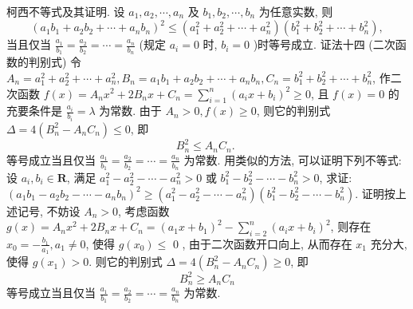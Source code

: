 柯西不等式及其证明.
设 $a_1, a_2, \cdots, a_n$ 及 $b_1, b_2, \cdots, b_n$ 为任意实数, 则
$$
\left(a_1 b_1+a_2 b_2+\cdots+a_n b_n\right)^2 \leqslant\left(a_1^2+a_2^2+\cdots+a_n^2\right)\left(b_1^2+b_2^2+\cdots+b_n^2\right),
$$
当且仅当 $\frac{a_1}{b_1}=\frac{a_2}{b_2}=\cdots=\frac{a_n}{b_n}$ (规定 $a_i=0$ 时, $b_i=0$ )时等号成立.
证法十四 (二次函数的判别式)
令 $A_n=a_1^2+a_2^2+\cdots+a_n^2, B_n=a_1 b_1+a_2 b_2+\cdots+a_n b_n, C_n=b_1^2+ b_2^2+\cdots+b_n^2$, 作二次函数 $f(x)=A_n x^2+2 B_n x+C_n=\sum_{i=1}^n\left(a_i x+b_i\right)^2 \geqslant 0$, 且 $f(x)=0$ 的充要条件是 $\frac{a_i}{b_i}=\lambda$ 为常数.
由于 $A_n>0, f(x) \geqslant 0$, 则它的判别式 $\Delta=4\left(B_n^2-A_n C_n\right) \leqslant 0$, 即
$$
B_n^2 \leqslant A_n C_n \text {. }
$$
等号成立当且仅当 $\frac{a_1}{b_1}=\frac{a_2}{b_2}=\cdots=\frac{a_n}{b_n}$ 为常数.
用类似的方法, 可以证明下列不等式:
设 $a_i, b_i \in \mathbf{R}$, 满足 $a_1^2-a_2^2-\cdots-a_n^2>0$ 或 $b_1^2-b_2^2-\cdots-b_n^2>0$, 求证: $\left(a_1 b_1-a_2 b_2-\cdots-a_n b_n\right)^2 \geqslant\left(a_1^2-a_2^2-\cdots-a_n^2\right)\left(b_1^2-b_2^2-\cdots-b_n^2\right)$.
证明按上述记号, 不妨设 $A_n>0$, 考虑函数 $g(x)=A_n x^2+2 B_n x+ C_n=\left(a_1 x+b_1\right)^2-\sum_{i=2}^n\left(a_i x+b_i\right)^2$, 则存在 $x_0=-\frac{b_1}{a_1}, a_1 \neq 0$, 使得 $g\left(x_0\right) \leqslant$ 0 , 由于二次函数开口向上, 从而存在 $x_1$ 充分大, 使得 $g\left(x_1\right)>0$. 则它的判别式 $\Delta=4\left(B_n^2-A_n C_n\right) \geqslant 0$, 即
$$
B_n^2 \geqslant A_n C_n
$$
等号成立当且仅当 $\frac{a_1}{b_1}=\frac{a_2}{b_2}=\cdots=\frac{a_n}{b_n}$ 为常数.



